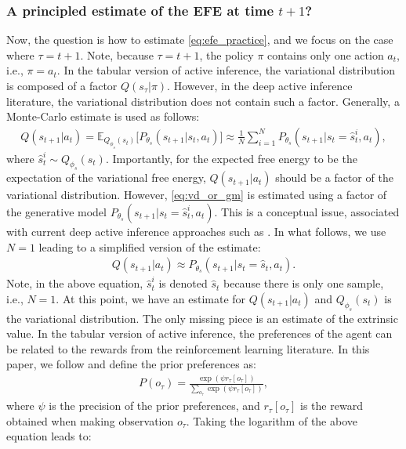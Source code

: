 \documentclass[twoside,11pt]{article}
\begin{document}
\subsubsection{A principled estimate of the EFE at time $t + 1$?}

Now, the question is how to estimate \eqref{eq:efe_practice}, and we focus on the case where $\tau = t + 1$. Note, because $\tau = t+1$, the policy $\pi$ contains only one action $a_t$, i.e., $\pi = a_t$. In the tabular version of active inference, the variational distribution is composed of a factor $Q(s_\tau | \pi)$. However, in the deep active inference literature, the variational distribution does not contain such a factor. Generally, a Monte-Carlo estimate is used as follows:
\begin{align}
Q(s_{t+1} | a_t) = \mathbb{E}_{Q_{\phi_s}(s_t)}\big[P_{\theta_s}(s_{t+1}|s_t, a_t)\big] \approx \frac{1}{N} \sum_{i = 1}^N P_{\theta_s}(s_{t+1}|s_t = \hat{s}_t^i, a_t), \label{eq:vd_or_gm}
\end{align}
where $\hat{s}_t^i \sim Q_{\phi_s}(s_t)$. Importantly, for the expected free energy to be the expectation of the variational free energy, $Q(s_{t+1} | a_t)$ should be a factor of the variational distribution. However, \eqref{eq:vd_or_gm} is estimated using a factor of the generative model $P_{\theta_s}(s_{t+1}|s_t = \hat{s}_t^i, a_t)$. This is a conceptual issue, associated with current deep active inference approaches such as \citet{DeepAIwithMCMC}.
In what follows, we use $N=1$ leading to a simplified version of the estimate:
\begin{align}
Q(s_{t+1} | a_t) \approx P_{\theta_s}(s_{t+1}|s_t = \hat{s}_t, a_t).
\end{align}
Note, in the above equation, $\hat{s}_t^i$ is denoted $\hat{s}_t$ because there is only one sample, i.e., $N=1$. At this point, we have an estimate for $Q(s_{t+1} | a_t)$ and $Q_{\phi_s}(s_t)$ is the variational distribution. The only missing piece is an estimate of the extrinsic value. In the tabular version of active inference, the preferences of the agent can be related to the rewards from the reinforcement learning literature. In this paper, we follow \citep{dacosta2020relationship} and define the prior preferences as:
\begin{align*}
P(o_\tau) = \frac{\exp(\psi r_\tau[o_\tau])}{\sum_{o_\tau} \exp(\psi r_\tau[o_\tau])},
\end{align*}
where $\psi$ is the precision of the prior preferences, and $r_\tau[o_\tau]$ is the reward obtained when making observation $o_\tau$. Taking the logarithm of the above equation leads to:
\end{document}
